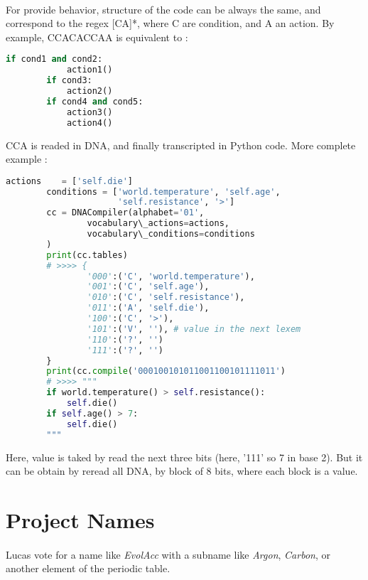 \documentclass{report} %
\begin{document}
    \paragraph*{}
    For provide behavior, structure of the code can be always the same, and correspond to the regex [CA]*, where C are condition, and A an action.
    By example, CCACACCAA is equivalent to :
    \begin{lstlisting}[language=Python]
        if cond1 and cond2:
            action1()
        if cond3:
            action2()
        if cond4 and cond5:
            action3()
            action4()
    \end{lstlisting}
    CCA is readed in DNA, and finally transcripted in Python code. 
    More complete example :
    \begin{lstlisting}[language=Python]
        actions    = ['self.die']
        conditions = ['world.temperature', 'self.age', 
                      'self.resistance', '>']
        cc = DNACompiler(alphabet='01', 
                vocabulary\_actions=actions, 
                vocabulary\_conditions=conditions
        )
        print(cc.tables)
        # >>>> {
                '000':('C', 'world.temperature'), 
                '001':('C', 'self.age'), 
                '010':('C', 'self.resistance'), 
                '011':('A', 'self.die'), 
                '100':('C', '>'),
                '101':('V', ''), # value in the next lexem
                '110':('?', '')
                '111':('?', '')
        }
        print(cc.compile('000100101011001100101111011')
        # >>>> """
        if world.temperature() > self.resistance():
            self.die()
        if self.age() > 7: 
            self.die()
        """
    \end{lstlisting}
    Here, value is taked by read the next three bits (here, '111' so 7 in base 2). But it can be obtain by reread all DNA, by block of 8 bits, where each block is a value.
    

    

\section*{Project Names}
    \paragraph*{}
    Lucas vote for a name like \textit{EvolAcc} with a subname like \textit{Argon}, \textit{Carbon}, or another element of the periodic table.


\end{document}
